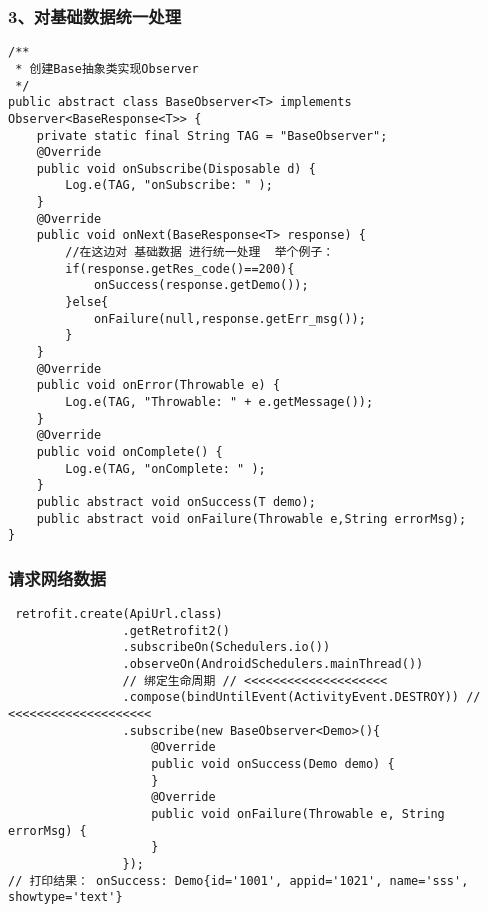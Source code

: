 \documentclass[9pt, b5paper]{article}
\begin{document}
\subsubsection{3、对基础数据统一处理}
\label{sec-18-1-3}
\begin{verbatim}
/**
 * 创建Base抽象类实现Observer
 */
public abstract class BaseObserver<T> implements Observer<BaseResponse<T>> {
    private static final String TAG = "BaseObserver";
    @Override
    public void onSubscribe(Disposable d) {
        Log.e(TAG, "onSubscribe: " );
    }
    @Override
    public void onNext(BaseResponse<T> response) {
        //在这边对 基础数据 进行统一处理  举个例子：
        if(response.getRes_code()==200){
            onSuccess(response.getDemo());
        }else{
            onFailure(null,response.getErr_msg());
        }
    }
    @Override
    public void onError(Throwable e) {
        Log.e(TAG, "Throwable: " + e.getMessage());
    }
    @Override
    public void onComplete() {
        Log.e(TAG, "onComplete: " );
    }
    public abstract void onSuccess(T demo);
    public abstract void onFailure(Throwable e,String errorMsg);
}
\end{verbatim}
\subsubsection{请求网络数据}
\label{sec-18-1-4}
\begin{verbatim}
 retrofit.create(ApiUrl.class)
                .getRetrofit2()
                .subscribeOn(Schedulers.io())
                .observeOn(AndroidSchedulers.mainThread())
                // 绑定生命周期 // <<<<<<<<<<<<<<<<<<<< 
                .compose(bindUntilEvent(ActivityEvent.DESTROY)) // <<<<<<<<<<<<<<<<<<<< 
                .subscribe(new BaseObserver<Demo>(){
                    @Override
                    public void onSuccess(Demo demo) {
                    }
                    @Override
                    public void onFailure(Throwable e, String errorMsg) {
                    }
                });
// 打印结果： onSuccess: Demo{id='1001', appid='1021', name='sss', showtype='text'}
\end{verbatim}
\end{document}

